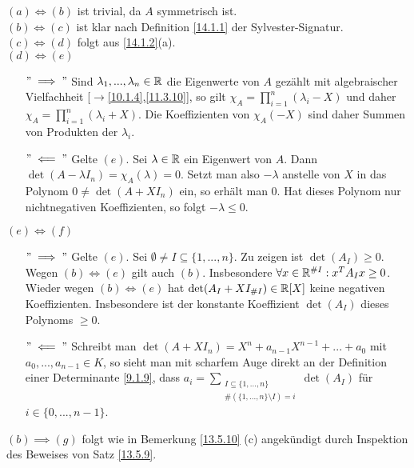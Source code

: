 \documentclass[../../main.tex]{subfiles}
\begin{document}
\begin{cproof}
\underline{$(a)\Longleftrightarrow(b)$} ist trivial, da $A$ symmetrisch ist.\\

\noindent\underline{$(b)\Longleftrightarrow(c)$} ist klar nach Definition \ref{14.1.1} der Sylvester-Signatur.\\
	
\noindent\underline{$(c)\Longleftrightarrow(d)$} folgt aus \ref{14.1.2}(a).\\

\noindent\underline{$(d)\Longleftrightarrow(e)$}
\begin{itemize}
\item[$"\implies"$] Sind $\lambda_1,...,\lambda_n\in \mathbb R$ die Eigenwerte von $A$ gezählt mit algebraischer Vielfachheit [$\to$\ref{10.1.4},\ref{11.3.10}], so gilt $\chi_A=\prod_{i=1}^n (\lambda_i-X)$ und daher $\chi_A=\prod_{i=1}^n (\lambda_i+X)$. Die Koeffizienten von $\chi_A(-X)$ sind daher Summen von Produkten der $\lambda_i$.
\item[$"\impliedby"$] Gelte $(e)$. Sei $\lambda\in \mathbb R$ ein Eigenwert von $A$. Dann $\det(A-\lambda I_n)=\chi_A(\lambda)=0$. Setzt man also $-\lambda$ anstelle von $X$ in das Polynom $0\neq \det(A+XI_n)$ ein, so erhält man 0. Hat dieses Polynom nur nichtnegativen Koeffizienten, so folgt $-\lambda\le 0$.
\end{itemize}

\noindent\underline{$(e)\Longleftrightarrow(f)$}\begin{itemize}
\item[$"\implies"$] Gelte $(e)$. Sei $\emptyset\neq I\subseteq\{1,...,n\}$. Zu zeigen ist $\det(A_I)\ge 0$. Wegen $(b)\Longleftrightarrow (e)$ gilt auch $(b)$. Insbesondere $\forall x\in \mathbb R^{\# I}: x^TA_Ix\ge 0$. Wieder wegen $(b)\Longleftrightarrow (e)$ hat $\det(A_I+XI_{\# I})\in \mathbb R[X]$ keine negativen Koeffizienten. Insbesondere ist der konstante Koeffizient $\det (A_I)$ dieses Polynoms $\ge 0$.
\item[$"\impliedby"$] Schreibt man $\det(A+XI_n)=X^n+a_{n-1}X^{n-1}+...+a_0$ mit $a_0,...,a_{n-1}\in K$, so sieht man mit scharfem Auge direkt an der Definition einer Determinante \ref{9.1.9}, dass $a_i=\sum_{\substack{I\subseteq \{1,...,n\}\\\#(\{1,...,n\}\setminus I)=i}} \det(A_I)$ für $i\in\{0,...,n-1\}$.
\end{itemize}

\noindent\underline{$(b)\implies (g)$} folgt wie in Bemerkung \ref{13.5.10} (c) angekündigt durch Inspektion des Beweises von Satz \ref{13.5.9}.


\end{cproof}
\end{document}
